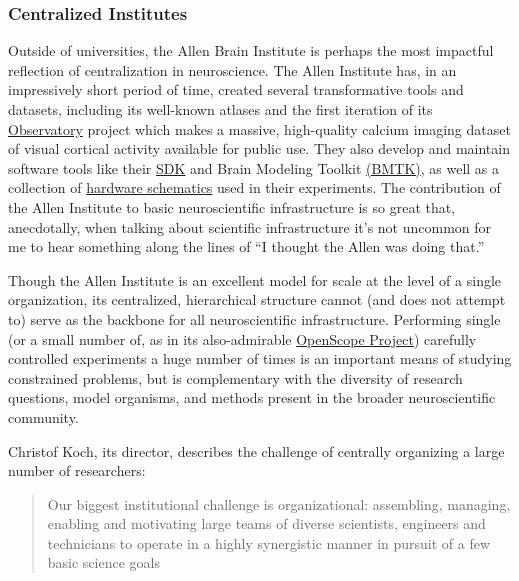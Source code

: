 \documentclass[10pt]{article}
\begin{document}
\begin{multicols}{2}
\hypertarget{centralized-institutes}{%
\subsubsection{Centralized Institutes}\label{centralized-institutes}}

Outside of universities, the Allen Brain Institute is perhaps the most
impactful reflection of centralization in neuroscience. The Allen
Institute has, in an impressively short period of time, created several
transformative tools and datasets, including its well-known atlases \cite{leinGenomewideAtlasGene2007}  and the first iteration of its
\href{http://observatory.brain-map.org/}{Observatory} project which
makes a massive, high-quality calcium imaging dataset of visual cortical
activity available for public use. They also develop and maintain
software tools like their
\href{https://allensdk.readthedocs.io/en/latest/}{SDK} and Brain
Modeling Toolkit \href{https://alleninstitute.github.io/bmtk/}{(BMTK)},
as well as a collection of
\href{https://portal.brain-map.org/explore/toolkit/hardware}{hardware
schematics} used in their experiments. The contribution of the Allen
Institute to basic neuroscientific infrastructure is so great that,
anecdotally, when talking about scientific infrastructure it's not
uncommon for me to hear something along the lines of ``I thought the
Allen was doing that.''

Though the Allen Institute is an excellent model for scale at the level
of a single organization, its centralized, hierarchical structure cannot
(and does not attempt to) serve as the backbone for all neuroscientific
infrastructure. Performing single (or a small number of, as in its
also-admirable
\href{https://alleninstitute.org/what-we-do/brain-science/news-press/articles/three-collaborative-studies-launch-openscope-shared-observatory-neuroscience}{OpenScope
Project}) carefully controlled experiments a huge number of times is an
important means of studying constrained problems, but is complementary
with the diversity of research questions, model organisms, and methods
present in the broader neuroscientific community.

Christof Koch, its director, describes the challenge of centrally
organizing a large number of researchers:

\begin{quote}
Our biggest institutional challenge is organizational: assembling,
managing, enabling and motivating large teams of diverse scientists,
engineers and technicians to operate in a highly synergistic manner in
pursuit of a few basic science goals \cite{grillnerWorldwideInitiativesAdvance2016} 
\end{quote}


\end{multicols}
\end{document}
